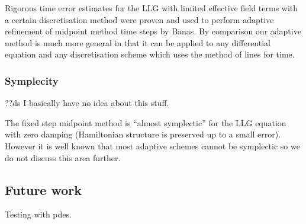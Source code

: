 Rigorous time error estimates for the LLG with limited effective field terms with a certain discretisation method were proven and used to perform adaptive refinement of midpoint method time steps by Banas.\cite{Banas-thesis}
By comparison our adaptive method is much more general in that it can be applied to any differential equation and any discretisation scheme which uses the method of lines for time.

\subsubsection{Symplecity}

??ds I basically have no idea about this stuff.

The fixed step midpoint method is ``almost symplectic'' for the LLG equation with zero damping (Hamiltonian structure is preserved up to a small error).\cite{Austin1993}
However it is well known that most adaptive schemes cannot be symplectic\cite{Iserles2009} %
so we do not discuss this area further.


\subsection{Future work}


Testing with pdes.



